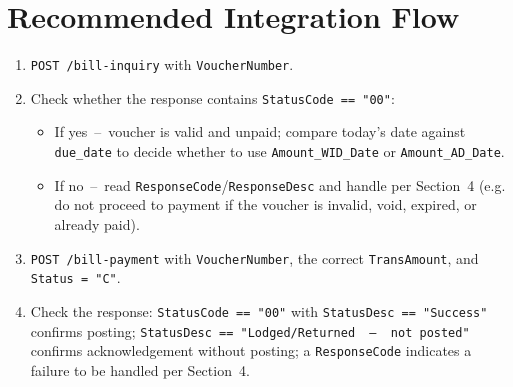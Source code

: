 \documentclass[11pt]{article}
\begin{document}
\section{Recommended Integration Flow}
\begin{enumerate}
    \item \texttt{POST /bill-inquiry} with \texttt{VoucherNumber}.
    \item Check whether the response contains \texttt{StatusCode == "00"}:
    \begin{itemize}
        \item If yes \,--\, voucher is valid and unpaid; compare today's date against
        \texttt{due\_date} to decide whether to use \texttt{Amount\_WID\_Date} or
        \texttt{Amount\_AD\_Date}.
        \item If no \,--\, read \texttt{ResponseCode}/\texttt{ResponseDesc} and handle per
        Section~4 (e.g. do not proceed to payment if the voucher is invalid, void, expired,
        or already paid).
    \end{itemize}
    \item \texttt{POST /bill-payment} with \texttt{VoucherNumber}, the correct
    \texttt{TransAmount}, and \texttt{Status = "C"}.
    \item Check the response: \texttt{StatusCode == "00"} with \texttt{StatusDesc == "Success"}
    confirms posting; \texttt{StatusDesc == "Lodged/Returned \,--\, not posted"} confirms
    acknowledgement without posting; a \texttt{ResponseCode} indicates a failure to be handled
    per Section~4.
\end{enumerate}
\end{document}
